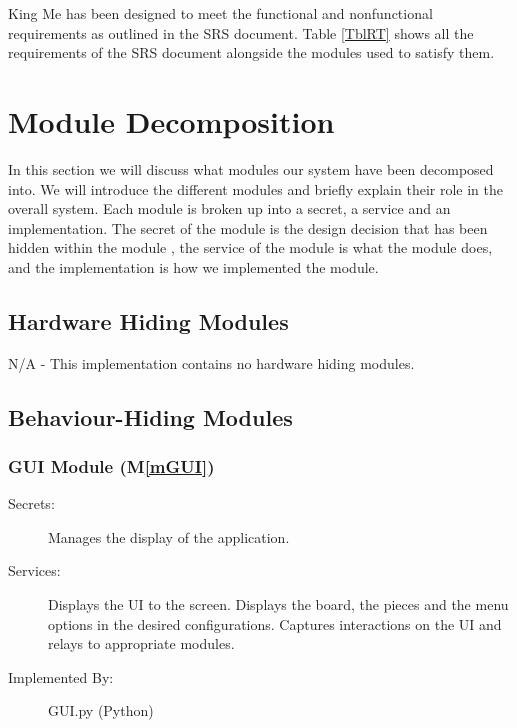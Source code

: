 \documentclass[12pt, titlepage]{article}
\newcommand{\mref}[1]{M\ref{#1}}
\begin{document}
King Me has been designed to meet the functional and nonfunctional requirements as outlined in the SRS document. Table \ref{TblRT} shows all the requirements of the SRS document alongside the modules used to satisfy them. 

\section{Module Decomposition} \label{SecMD}

In this section we will discuss what modules our system have been decomposed into. We will introduce the different modules and briefly explain their role in the overall system. Each module is broken up into a secret, a service and an implementation. The secret of the module is the design decision that has been hidden within the module , the service of the module is what the module does, and the implementation is how we implemented the module.

\subsection{Hardware Hiding Modules}
\begin{description}
\item N/A - This implementation contains no hardware hiding modules.
\end{description}

\subsection{Behaviour-Hiding Modules}

\subsubsection{GUI Module (\mref{mGUI})}

\begin{description}
\item[Secrets:] Manages the display of the application.
\item[Services:] Displays the UI to the screen. Displays the board, the pieces and the menu options in the desired configurations. Captures interactions on the UI and relays to appropriate modules.
\item[Implemented By:] GUI.py (Python)
\end{description}
\end{document}

